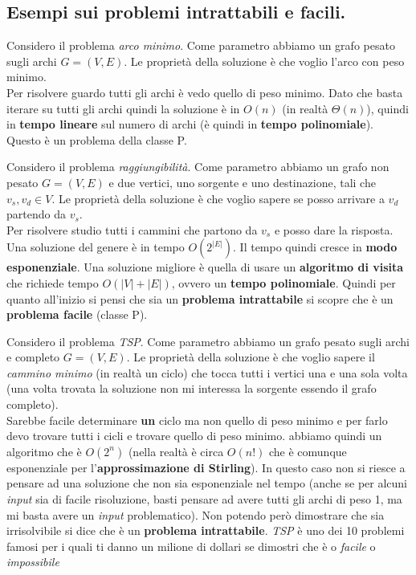 \subsection{Esempi sui problemi intrattabili e facili.}
\begin{esempio}
	Considero il problema \emph{arco minimo}. Come parametro abbiamo un grafo pesato
	sugli archi $G=(V,E)$. Le proprietà della soluzione è che voglio l'arco con
	peso minimo.\\
	Per risolvere guardo tutti gli archi è vedo quello di peso minimo. Dato che
	basta iterare su tutti gli archi quindi la soluzione è in $O(n)$ (in realtà
	$\Theta(n)$), quindi in \textbf{tempo lineare} sul numero di archi (è quindi
	in \textbf{tempo polinomiale}). Questo è un problema della classe P.
\end{esempio}
\begin{esempio}
	Considero il problema \emph{raggiungibilità}. Come parametro abbiamo un grafo non
	pesato $G=(V,E)$ e due vertici, uno sorgente e uno destinazione, tali che
	$v_s,v_d\in V$. Le proprietà della soluzione è che voglio sapere se posso
	arrivare a $v_d$ partendo da $v_s$.\\
	Per risolvere studio tutti i cammini che partono da $v_s$ e posso dare la
	risposta. Una soluzione del genere è in tempo $O(2^{|E|})$. Il tempo quindi
	cresce in \textbf{modo esponenziale}. Una soluzione migliore è quella di usare
	un \textbf{algoritmo di visita} che richiede tempo $O(|V|+|E|)$, ovvero un
	\textbf{tempo polinomiale}. Quindi per quanto all'inizio si pensi
	che sia un \textbf{problema intrattabile} si scopre che è un \textbf{problema
	facile} (classe P).
\end{esempio}
\begin{esempio}
	Considero il problema \emph{TSP}. Come parametro abbiamo un grafo pesato sugli
	archi e completo $G=(V,E)$. Le proprietà della soluzione è che voglio sapere
	il \emph{cammino minimo} (in realtà un ciclo) che tocca tutti i vertici una e
	una sola volta (una volta trovata la soluzione non mi interessa la sorgente
	essendo il grafo completo). \\
	Sarebbe facile determinare \textbf{un} ciclo ma non quello di peso minimo e
	per farlo devo trovare tutti i cicli e trovare quello di peso minimo. abbiamo
	quindi un algoritmo che è $O(2^n)$ (nella realtà è circa $O(n!)$ che è
	comunque esponenziale per l'\textbf{approssimazione di Stirling}). In questo
	caso non si riesce a pensare ad una soluzione che non sia esponenziale nel
	tempo (anche se per alcuni \textit{input} sia di facile risoluzione, basti pensare ad
	avere tutti gli archi di peso 1, ma mi basta avere un \textit{input} problematico). Non
	potendo però dimostrare che sia irrisolvibile si dice che è un
	\textbf{problema intrattabile}. \textit{TSP} è uno dei 10 problemi famosi per
	i quali ti danno un milione di dollari se dimostri che è o \emph{facile} o
	\emph{impossibile}
\end{esempio}

